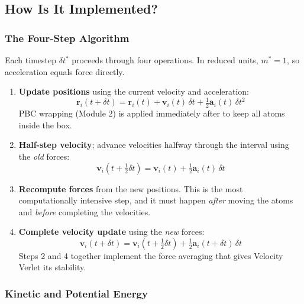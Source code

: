\subsection{How Is It Implemented?}

\subsubsection{The Four-Step Algorithm}

Each timestep $\delta t^*$ proceeds through four operations. In reduced units, $m^* = 1$, so acceleration equals force directly.

\begin{enumerate}
    \item \textbf{Update positions} using the current velocity and acceleration:
    \begin{equation}
        \mathbf{r}_i(t+\delta t) = \mathbf{r}_i(t) + \mathbf{v}_i(t)\,\delta t + \tfrac{1}{2}\mathbf{a}_i(t)\,\delta t^2
        \label{eq:vv_pos}
    \end{equation}
    PBC wrapping (Module 2) is applied immediately after to keep all atoms inside the box.

    \item \textbf{Half-step velocity}; advance velocities halfway through the interval using the \emph{old} forces:
    \begin{equation}
        \mathbf{v}_i\!\left(t + \tfrac{1}{2}\delta t\right) = \mathbf{v}_i(t) + \tfrac{1}{2}\mathbf{a}_i(t)\,\delta t
        \label{eq:vv_vhalf}
    \end{equation}

    \item \textbf{Recompute forces} from the new positions. This is the most computationally intensive step, and it must happen \emph{after} moving the atoms and \emph{before} completing the velocities.

    \item \textbf{Complete velocity update} using the \emph{new} forces:
    \begin{equation}
        \mathbf{v}_i(t + \delta t) = \mathbf{v}_i\!\left(t + \tfrac{1}{2}\delta t\right) + \tfrac{1}{2}\mathbf{a}_i(t+\delta t)\,\delta t
        \label{eq:vv_vfull}
    \end{equation}
    Steps 2 and 4 together implement the force averaging that gives Velocity Verlet its stability.
\end{enumerate}

\subsubsection{Kinetic and Potential Energy}

